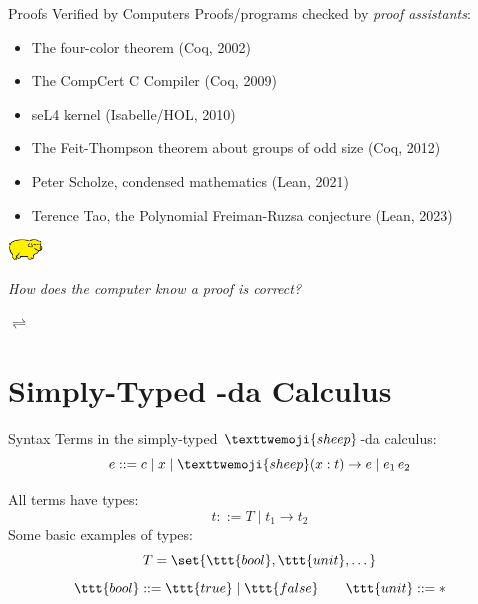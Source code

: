 \documentclass{beamer}
\newcommand{\lamb}{\texttwemoji{sheep}}
\begin{document}
\begin{frame}{Proofs Verified by Computers}
 \small{Proofs/programs checked by \emph{proof assistants}:} 
 \begin{itemize}
   \item The four-color theorem (Coq, 2002) 
   \item The CompCert C Compiler (Coq, 2009)
   \item seL4 kernel (Isabelle/HOL, 2010)
   \item The Feit-Thompson theorem about groups of odd
     size (Coq, 2012) \pause 
   \item Peter Scholze, condensed mathematics (Lean, 2021)
   \item Terence Tao, the Polynomial Freiman-Ruzsa conjecture (Lean, 2023)
 \end{itemize}
\end{frame}

\begin{frame}{\includegraphics[width=26pt]{yellowPig.png}}
  \begin{center}
    \Huge{\textit{How does the computer know a proof is correct?}}

    \Huge{ $\rightleftharpoons$
    }

  \end{center}
\end{frame}


\section{Simply-Typed \texorpdfstring{\lamb}{lamb}-da Calculus}

\begin{frame}{Syntax}
Terms in the simply-typed $\lamb$-da calculus:
\[
  e ::= c \mid x \mid \lamb(x:t) \to e \mid e_1 \, e_2 
\] 

All terms have types:
\[
  t ::= T \mid t_1 \to t_2
\]
\pause
Some basic examples of types: 
\[
  T = \set{\ttt{bool}, \ttt{unit}, \dots}
\] 
\[
\ttt{bool} ::= \ttt{true} \mid \ttt{false} \qquad \ttt{unit} ::= *
\] 


\end{frame}
\end{document}
